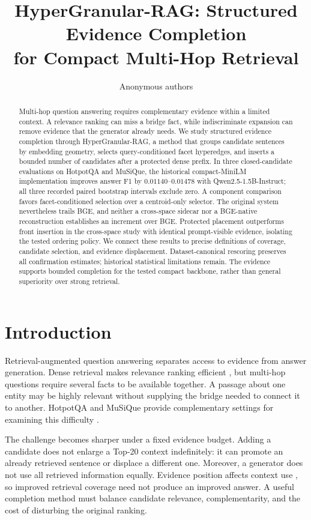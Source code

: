 \documentclass[11pt]{article}
\title{HyperGranular-RAG: Structured Evidence Completion\\
for Compact Multi-Hop Retrieval}
\author{Anonymous authors}
\newcommand{\hgrag}{HyperGranular-RAG\xspace}
\begin{document}
\maketitle

\begin{abstract}
Multi-hop question answering requires complementary evidence within a limited
context. A relevance ranking can miss a bridge fact, while indiscriminate
expansion can remove evidence that the generator already needs.
We study structured evidence completion through \hgrag, a method that groups
candidate sentences by embedding geometry, selects query-conditioned facet
hyperedges, and inserts a bounded number of candidates after a protected
dense prefix. In three closed-candidate evaluations on HotpotQA and MuSiQue,
the historical compact-MiniLM implementation improves answer F1 by
$0.01140$--$0.01478$ with Qwen2.5-1.5B-Instruct; all three recorded paired
bootstrap intervals exclude zero. A component comparison favors
facet-conditioned selection over a centroid-only selector. The original system
nevertheless trails BGE, and neither a cross-space sidecar nor a BGE-native
reconstruction establishes an increment over BGE. Protected placement
outperforms front insertion in the cross-space study with identical
prompt-visible evidence, isolating the tested ordering policy.
We connect these results to precise definitions of coverage, candidate
selection, and evidence displacement. Dataset-canonical rescoring preserves
all confirmation estimates; historical statistical limitations remain.
The evidence supports bounded completion for the
tested compact backbone, rather than general superiority over strong retrieval.
\end{abstract}

\section{Introduction}
Retrieval-augmented question answering separates access to evidence from
answer generation. Dense retrieval makes relevance ranking efficient
\citep{karpukhin2020dpr}, but multi-hop questions require several facts to be
available together. A passage about one entity may be highly relevant without
supplying the bridge needed to connect it to another. HotpotQA and MuSiQue
provide complementary settings for examining this difficulty
\citep{yang2018hotpotqa,trivedi2022musique}.

The challenge becomes sharper under a fixed evidence budget. Adding a
candidate does not enlarge a Top-20 context indefinitely: it can promote an
already retrieved sentence or displace a different one. Moreover, a generator
does not use all retrieved information equally. Evidence position affects
context use \citep{liu2024lostmiddle}, so improved retrieval coverage need not
produce an improved answer. A useful completion method must balance
candidate relevance, complementarity, and the cost of disturbing the original
ranking.
\end{document}
